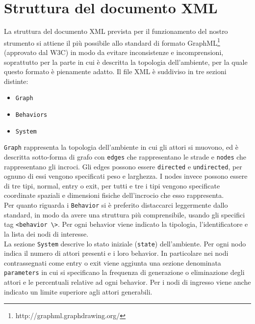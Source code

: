\section{Struttura del documento XML}
La struttura del documento XML prevista per il funzionamento del nostro strumento si attiene il più possibile allo standard di formato GraphML\footnote{http://graphml.graphdrawing.org/} (approvato dal W3C) in modo da evitare inconsistenze e incomprensioni, soprattutto per la parte in cui è descritta la topologia dell'ambiente, per la quale questo formato è pienamente adatto.
Il file XML è suddiviso in tre sezioni distinte:
\begin{itemize}
\item \texttt{Graph}
\item \texttt{Behaviors}
\item \texttt{System}
\end{itemize} 
\texttt{Graph} rappresenta la topologia dell'ambiente in cui gli attori si muovono, ed è descritta sotto-forma di grafo con \texttt{edges} che rappresentano le strade e \texttt{nodes} che rappresentano gli incroci. Gli edges possono essere \texttt{directed} e \texttt{undirected}, per ognuno di essi vengono specificati peso e larghezza. I nodes invece possono essere di tre tipi, normal, entry o exit, per tutti e tre i tipi vengono specificate coordinate spaziali e dimensioni fisiche dell'incrocio che esso rappresenta.\\
Per quanto riguarda i \texttt{Behavior} si è preferito distaccarci leggermente dallo standard, in modo da avere una struttura più comprensibile, usando gli specifici tag \texttt{<behavior \textbackslash>}. Per ogni behavior viene indicato la tipologia, l'identificatore e la lista dei nodi di interesse.\\
La sezione \texttt{System} descrive lo stato iniziale (\texttt{state}) dell'ambiente. Per ogni nodo indica il numero di attori presenti e i loro behavior. In particolare nei nodi contrassegnati come entry o exit viene aggiunta una sezione denominata \texttt{parameters} in cui si specificano la frequenza di generazione o eliminazione degli attori e le percentuali relative ad ogni behavior. Per i nodi di ingresso viene anche indicato un limite superiore agli attori generabili.

